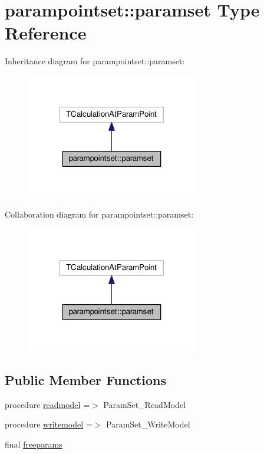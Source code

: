 \hypertarget{structparampointset_1_1paramset}{}\section{parampointset\+:\+:paramset Type Reference}
\label{structparampointset_1_1paramset}


Inheritance diagram for parampointset\+:\+:paramset\+:
\nopagebreak
\begin{figure}[H]
\begin{center}
\leavevmode
\includegraphics[width=212pt]{structparampointset_1_1paramset__inherit__graph}
\end{center}
\end{figure}


Collaboration diagram for parampointset\+:\+:paramset\+:
\nopagebreak
\begin{figure}[H]
\begin{center}
\leavevmode
\includegraphics[width=212pt]{structparampointset_1_1paramset__coll__graph}
\end{center}
\end{figure}
\subsection*{Public Member Functions}
\begin{DoxyCompactItemize}
\item 
procedure \mbox{\hyperlink{structparampointset_1_1paramset_a08d623dd4f82a86b4c1c2eee0685edf3}{readmodel}} =$>$ Param\+Set\+\_\+\+Read\+Model
\item 
procedure \mbox{\hyperlink{structparampointset_1_1paramset_ab5a8c58fc6126f75f8f970a22c624103}{writemodel}} =$>$ Param\+Set\+\_\+\+Write\+Model
\item 
final \mbox{\hyperlink{structparampointset_1_1paramset_a867d45dc423d0d6a2ca03b75bd64d83a}{freeparams}}
\end{DoxyCompactItemize}
